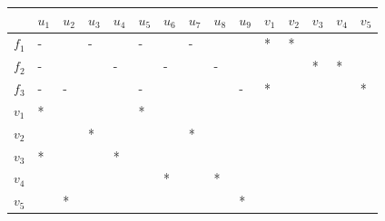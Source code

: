 \begin{longtable}[]{@{}cllllllllllllllllllll@{}}
\begin{minipage}[t]{0.02\columnwidth}
\strut
\end{minipage} & \begin{minipage}[t]{0.05\columnwidth}\raggedright
\strut
\end{minipage} & \begin{minipage}[t]{0.02\columnwidth}\raggedright
\strut
\end{minipage} & \begin{minipage}[t]{0.05\columnwidth}\raggedright
\strut
\end{minipage} & \begin{minipage}[t]{0.02\columnwidth}\raggedright
\strut
\end{minipage} & \begin{minipage}[t]{0.02\columnwidth}\raggedright
\strut
\end{minipage} & \begin{minipage}[t]{0.02\columnwidth}\raggedright
\strut
\end{minipage} & \begin{minipage}[t]{0.02\columnwidth}\raggedright
\strut
\end{minipage} & \begin{minipage}[t]{0.02\columnwidth}\raggedright
\strut
\end{minipage} & \begin{minipage}[t]{0.02\columnwidth}\raggedright
\strut
\end{minipage} & \begin{minipage}[t]{0.02\columnwidth}\raggedright
\strut
\end{minipage} & \begin{minipage}[t]{0.02\columnwidth}\raggedright
\strut
\end{minipage} & \begin{minipage}[t]{0.02\columnwidth}\raggedright
\strut
\end{minipage} & \begin{minipage}[t]{0.02\columnwidth}\raggedright
\strut
\end{minipage}\tabularnewline
\bottomrule
\end{longtable}

\begin{longtable}[]{@{}lllllllllllllll@{}}
\toprule
& \(u_1\) & \(u_2\) & \(u_3\) & \(u_4\) & \(u_5\) & \(u_6\) & \(u_7\) &
\(u_8\) & \(u_9\) & \(v_1\) & \(v_2\) & \(v_3\) & \(v_4\) &
\(v_5\)\tabularnewline
\midrule
\endhead
\(f_1\) & - & & - & & - & & - & & & * & * & & &\tabularnewline
\(f_2\) & - & & & - & & - & & - & & & & * & * &\tabularnewline
\(f_3\) & - & - & & & - & & & & - & * & & & & *\tabularnewline
\(v_1\) & * & & & & * & & & & & & & & &\tabularnewline
\(v_2\) & & & * & & & & * & & & & & & &\tabularnewline
\(v_3\) & * & & & * & & & & & & & & & &\tabularnewline
\(v_4\) & & & & & & * & & * & & & & & &\tabularnewline
\(v_5\) & & * & & & & & & & * & & & & &\tabularnewline
\bottomrule
\end{longtable}

